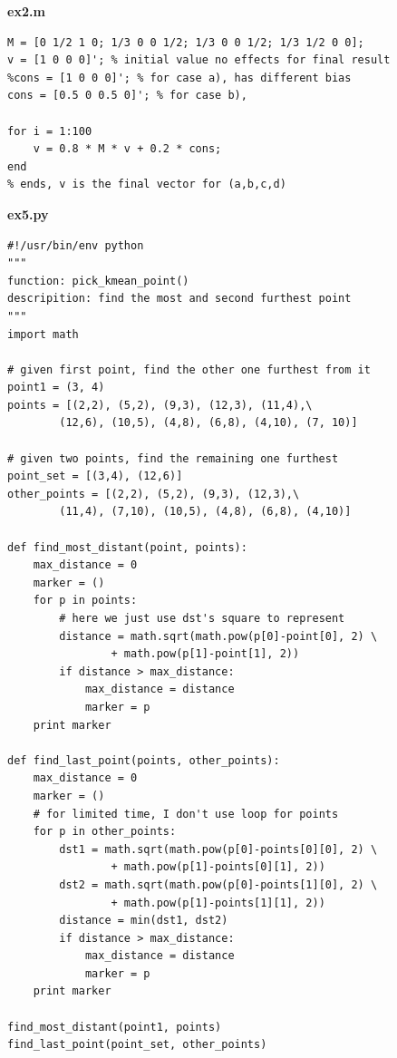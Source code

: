 \documentclass{article}
\begin{document}
\textbf{ex2.m}

\begin{lstlisting}[frame=single]
M = [0 1/2 1 0; 1/3 0 0 1/2; 1/3 0 0 1/2; 1/3 1/2 0 0]; 
v = [1 0 0 0]'; % initial value no effects for final result
%cons = [1 0 0 0]'; % for case a), has different bias
cons = [0.5 0 0.5 0]'; % for case b), 

for i = 1:100
    v = 0.8 * M * v + 0.2 * cons;
end
% ends, v is the final vector for (a,b,c,d)
\end{lstlisting}



\textbf{ex5.py}

\begin{lstlisting}[frame=single]
#!/usr/bin/env python
"""
function: pick_kmean_point()
descripition: find the most and second furthest point
"""
import math

# given first point, find the other one furthest from it
point1 = (3, 4)
points = [(2,2), (5,2), (9,3), (12,3), (11,4),\
        (12,6), (10,5), (4,8), (6,8), (4,10), (7, 10)]

# given two points, find the remaining one furthest
point_set = [(3,4), (12,6)]
other_points = [(2,2), (5,2), (9,3), (12,3),\
        (11,4), (7,10), (10,5), (4,8), (6,8), (4,10)]

def find_most_distant(point, points):
    max_distance = 0
    marker = ()
    for p in points:
        # here we just use dst's square to represent
        distance = math.sqrt(math.pow(p[0]-point[0], 2) \
                + math.pow(p[1]-point[1], 2))
        if distance > max_distance:
            max_distance = distance
            marker = p
    print marker

def find_last_point(points, other_points):
    max_distance = 0
    marker = ()
    # for limited time, I don't use loop for points
    for p in other_points:
        dst1 = math.sqrt(math.pow(p[0]-points[0][0], 2) \
                + math.pow(p[1]-points[0][1], 2))
        dst2 = math.sqrt(math.pow(p[0]-points[1][0], 2) \
                + math.pow(p[1]-points[1][1], 2))
        distance = min(dst1, dst2)
        if distance > max_distance:
            max_distance = distance
            marker = p
    print marker

find_most_distant(point1, points)
find_last_point(point_set, other_points)
\end{lstlisting}
\end{document}
